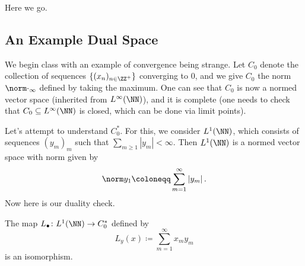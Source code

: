 \documentclass[../notes.tex]{subfiles}
\begin{document}
Here we go.

\subsection{An Example Dual Space} \label{subsec:dual-c0}
We begin class with an example of convergence being strange. Let $C_0$ denote the collection of sequences $\{(x_n)_{n\in\ZZ^+}\}$ converging to $0$, and we give $C_0$ the norm $\norm\cdot_\infty$ defined by taking the maximum. One can see that $C_0$ is now a normed vector space (inherited from $L^\infty(\NN)$), and it is complete (one needs to check that $C_0\subseteq L^\infty(\NN)$ is closed, which can be done via limit points).

Let's attempt to understand $C_0^*$. For this, we consider $L^1(\NN)$, which consists of sequences $(y_m)_m$ such that $\sum_{m\ge1}\left|y_m\right|<\infty$. Then $L^1(\NN)$ is a normed vector space with norm given by
\[\norm y_1\coloneqq\sum_{m=1}^\infty\left|y_m\right|.\]
Now here is our duality check.
\begin{lemma} \label{lem:dual-c0}
	The map $L_\bullet\colon L^1(\NN)\to C_0^*$ defined by
	\[L_y(x)\coloneqq\sum_{m=1}^\infty x_my_m\]
	is an isomorphism.
\end{lemma}
\end{document}
